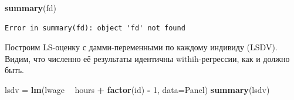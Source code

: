 \documentclass[]{book}
\newenvironment{Shaded}{\begin{snugshade}}{\end{snugshade}}
\newcommand{\DataTypeTok}[1]{\textcolor[rgb]{0.13,0.29,0.53}{#1}}
\newcommand{\DecValTok}[1]{\textcolor[rgb]{0.00,0.00,0.81}{#1}}
\newcommand{\KeywordTok}[1]{\textcolor[rgb]{0.13,0.29,0.53}{\textbf{#1}}}
\newcommand{\NormalTok}[1]{#1}
\newcommand{\OperatorTok}[1]{\textcolor[rgb]{0.81,0.36,0.00}{\textbf{#1}}}
\newcommand{\StringTok}[1]{\textcolor[rgb]{0.31,0.60,0.02}{#1}}
\begin{document}
\begin{Shaded}
\begin{Highlighting}[]
\KeywordTok{summary}\NormalTok{(fd)}
\end{Highlighting}
\end{Shaded}

\begin{verbatim}
Error in summary(fd): object 'fd' not found
\end{verbatim}

Построим LS-оценку с дамми-переменными по каждому индивиду (LSDV). Видим, что численно её результаты идентичны withih-регрессии, как и должно быть.

\begin{Shaded}
\begin{Highlighting}[]
\NormalTok{lsdv =}\StringTok{ }\KeywordTok{lm}\NormalTok{(lwage }\OperatorTok{~}\StringTok{ }\NormalTok{hours }\OperatorTok{+}\StringTok{ }\KeywordTok{factor}\NormalTok{(id) }\OperatorTok{-}\StringTok{ }\DecValTok{1}\NormalTok{, }\DataTypeTok{data=}\NormalTok{Panel)}
\KeywordTok{summary}\NormalTok{(lsdv)}
\end{Highlighting}
\end{Shaded}
\end{document}
